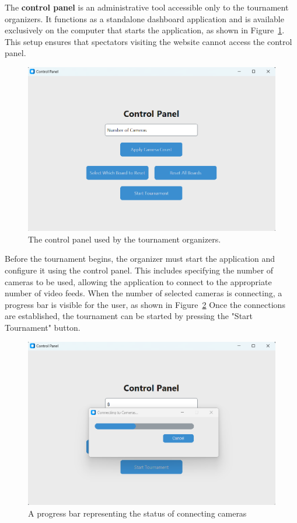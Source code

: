 The \textbf{control panel} is an administrative tool accessible only to the tournament organizers. It functions as a standalone dashboard application and is available exclusively on the computer that starts the application, as shown in Figure~\ref{fig:control-panel}. This setup ensures that spectators visiting the website cannot access the control panel. \\

\begin{figure}[h!] \centering \includegraphics[width=0.75\linewidth]{figures/results/frontend/control-panel/control-panel.png} \caption[Control panel for tournament organizers]{The control panel used by the tournament organizers.}\label{fig:control-panel} \end{figure}

Before the tournament begins, the organizer must start the application and configure it using the control panel. This includes specifying the number of cameras to be used, allowing the application to connect to the appropriate number of video feeds. When the number of selected cameras is connecting, a progress bar is visible for the user, as shown in Figure~\ref{fig:control-panel-camera} Once the connections are established, the tournament can be started by pressing the "Start Tournament" button. \\
 
\begin{figure}[h!] \centering \includegraphics[width=0.75\linewidth]{figures/results/frontend/control-panel/camera-progress.png} \caption[Progress bar for camera connections]{A progress bar representing the status of connecting cameras}\label{fig:control-panel-camera} \end{figure}

